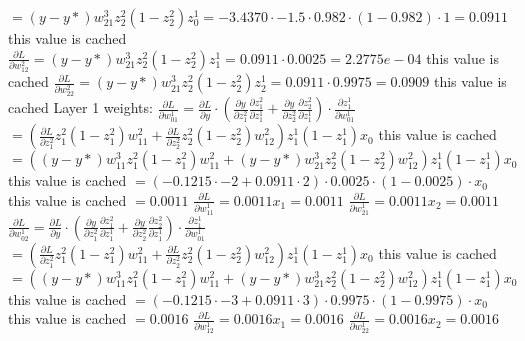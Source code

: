 \documentclass[12pt, fullpage,letterpaper]{article}
\begin{document}
\begin{enumerate}
	\newline $=(y-y*)w^3_{21}z^2_2(1-z^2_2)z^1_0=-3.4370\cdot-1.5\cdot0.982\cdot(1-0.982)\cdot1=0.0911$ this value is cached
	\newline  $\frac{\partial L}{\partial w^2_{12}}=(y-y*)w^3_{21}z^2_2(1-z^2_2)z^1_1=0.0911\cdot0.0025=2.2775e-04$ this value is cached
	\newline  $\frac{\partial L}{\partial w^2_{22}}=(y-y*)w^3_{21}z^2_2(1-z^2_2)z^1_2=0.0911\cdot0.9975=0.0909$ this value is cached
	\newline Layer 1 weights:
	\newline $\frac{\partial L}{\partial w^1_{01}}=\frac{\partial L}{\partial y}\cdot(\frac{\partial y}{\partial z^2_1}\frac{\partial z^2_1}{\partial z^1_1}+\frac{\partial y}{\partial z^2_2}\frac{\partial z^2_2}{\partial z^1_1})\cdot\frac{\partial z^1_1}{\partial w^1_{01}}$
	\newline $=(\frac{\partial L}{\partial z^2_1}z^2_1(1-z^2_1)w^2_{11}+\frac{\partial L}{\partial z^2_2}z^2_2(1-z^2_2)w^2_{12})z^1_1(1-z^1_1)x_0$ this value is cached
	\newline $=((y-y*)w^3_{11}z^2_1(1-z^2_1)w^2_{11}+(y-y*)w^3_{21}z^2_2(1-z^2_2)w^2_{12})z^1_1(1-z^1_1)x_0$ this value is cached
	\newline $=(-0.1215\cdot-2+0.0911\cdot2)\cdot0.0025\cdot(1-0.0025)\cdot x_0$ this value is cached
	\newline $=0.0011$
	\newline $\frac{\partial L}{\partial w^1_{11}}=0.0011x_1=0.0011$
	\newline $\frac{\partial L}{\partial w^1_{21}}=0.0011x_2=0.0011$
	\newline $\frac{\partial L}{\partial w^1_{02}}=\frac{\partial L}{\partial y}\cdot(\frac{\partial y}{\partial z^2_1}\frac{\partial z^2_1}{\partial z^1_1}+\frac{\partial y}{\partial z^2_2}\frac{\partial z^2_2}{\partial z^1_1})\cdot\frac{\partial z^1_1}{\partial w^1_{01}}$
	\newline $=(\frac{\partial L}{\partial z^2_1}z^2_1(1-z^2_1)w^2_{11}+\frac{\partial L}{\partial z^2_2}z^2_2(1-z^2_2)w^2_{12})z^1_1(1-z^1_1)x_0$ this value is cached
	\newline $=((y-y*)w^3_{11}z^2_1(1-z^2_1)w^2_{11}+(y-y*)w^3_{21}z^2_2(1-z^2_2)w^2_{12})z^1_1(1-z^1_1)x_0$ this value is cached
	\newline $=(-0.1215\cdot-3+0.0911\cdot3)\cdot0.9975\cdot(1-0.9975)\cdot x_0$ this value is cached
	\newline $=0.0016$
	\newline $\frac{\partial L}{\partial w^1_{12}}=0.0016x_1=0.0016$
	\newline $\frac{\partial L}{\partial w^1_{22}}=0.0016x_2=0.0016$
	

\end{enumerate}
\end{document}

